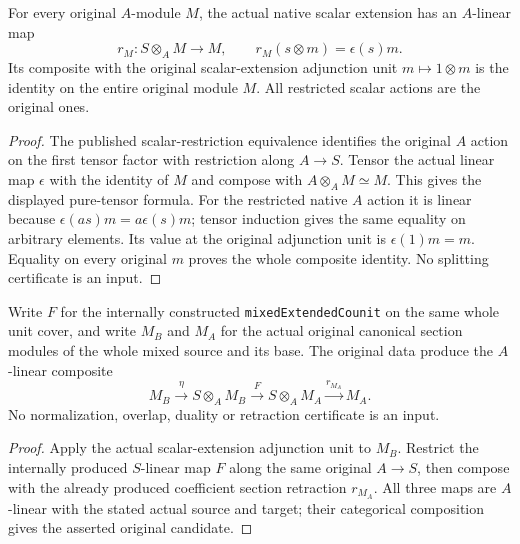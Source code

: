 \begin{lemma}
\label{lem:kn-global-trace-unit-section-retraction}
\leanok
For every original $A$-module $M$, the actual native scalar extension
has an $A$-linear map
\[
 r_M:S\otimes_A M\longrightarrow M,\qquad
 r_M(s\otimes m)=\epsilon(s)m.
\]
Its composite with the original scalar-extension adjunction unit
$m\mapsto1\otimes m$ is the identity on the entire original module $M$.
All restricted scalar actions are the original ones.
\end{lemma}
\begin{proof}
The published scalar-restriction equivalence identifies the original
$A$ action on the first tensor factor with restriction along $A\to S$.
Tensor the actual linear map $\epsilon$ with the identity of $M$ and
compose with $A\otimes_A M\simeq M$.  This gives the displayed pure-tensor
formula.  For the restricted native $A$ action it is linear because
$\epsilon(as)m=a\epsilon(s)m$; tensor induction gives the same equality
on arbitrary elements.  Its value at the original adjunction unit is
$\epsilon(1)m=m$.  Equality on every original $m$ proves the whole
composite identity.  No splitting certificate is an input.
\end{proof}

\begin{lemma}
\label{lem:kn-global-trace-mixed-canonical-candidate}
\leanok
Write $F$ for the internally constructed \texttt{mixedExtendedCounit}
on the same whole unit cover, and write $M_B$ and $M_A$ for the actual
original canonical section modules of the whole mixed source and its
base.  The original data produce the $A$-linear composite
\[
 M_B\xrightarrow{\eta} S\otimes_A M_B
   \xrightarrow{F}S\otimes_A M_A\xrightarrow{r_{M_A}}M_A.
\]
No normalization, overlap, duality or retraction certificate is an input.
\end{lemma}
\begin{proof}
Apply the actual scalar-extension adjunction unit to $M_B$.  Restrict the
internally produced $S$-linear map $F$ along the same original $A\to S$,
then compose with the already produced coefficient section retraction
$r_{M_A}$.  All three maps are $A$-linear with the stated actual source
and target; their categorical composition gives the asserted original
candidate.
\end{proof}

